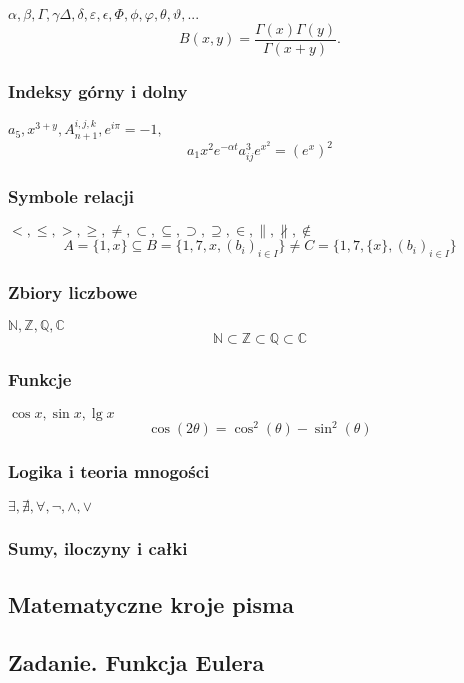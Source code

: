 \documentclass[a4paper, 12pt]{amsart}
\begin{document}
$\alpha, \beta, \Gamma, \gamma \Delta, \delta, \varepsilon, \epsilon, \Phi, \phi, \varphi, \theta, \vartheta, ...$
$$B(x,y)=\frac{\Gamma(x)\Gamma(y)}{\Gamma(x+y)}.$$

\subsubsection{Indeksy górny i dolny}

$a_{5}, x^{3+y}, A_{n+1}^{i,j,k}, e^{i\pi}=-1,$
$$a_{1}x^{2}e^{-\alpha t}a^{3}_{ij}e^{x^{2}}=(e^{x})^{2}$$

\subsubsection{Symbole relacji}

$<, \leq, >, \geq, \neq, \subset, \subseteq, \supset, \supseteq, \in, \parallel, \nparallel, \notin$
$$A=\{1,x\} \subseteq B = \{1,7,x,(b_{i})_{i \in I}\} \neq C = \{1,7,\{x\}, (b_{i})_{i \in I}\}$$

\subsubsection{Zbiory liczbowe}

$\mathbb{N}, \mathbb{Z}, \mathbb{Q}, \mathbb{C}$
$$\mathbb{N} \subset \mathbb{Z} \subset \mathbb{Q} \subset \mathbb{C}$$

\subsubsection {Funkcje}

$\cos{x}, \sin{x}, \lg{x}$
$$\cos(2\theta)=\cos^{2}(\theta)-\sin^{2}(\theta)$$

\subsubsection{Logika i teoria mnogości}
$\exists, \nexists, \forall, \neg, \land, \lor$


\subsubsection{Sumy, iloczyny i całki}

\subsection{Matematyczne kroje pisma}

\subsection{Zadanie. Funkcja Eulera}
\end{document}
